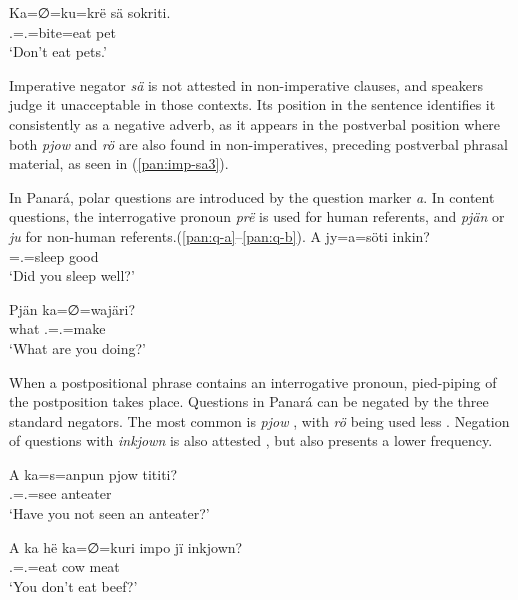 \documentclass[output=paper,colorlinks,citecolor=brown,draft]{langscibook}
\begin{document}
\ea\label{pan:imp-sa3}
    \gll Ka=∅=ku=krë sä sokriti.\\
    \Ssg.\Erg{}=\Tsg.\Abs{}=bite=eat \Neg{} pet \\
    \glt  `Don't eat pets.' \\
\z

Imperative negator \textit{sä} is not attested in non-imperative clauses, and speakers judge it unacceptable in those contexts. Its position in the sentence identifies it consistently as a negative adverb, as it appears in the postverbal position where both \textit{pjow} and \textit{rö} are also found in non-imperatives, preceding postverbal phrasal material, as seen in (\ref{pan:imp-sa3}).

In Panará, polar questions are introduced by the question marker \textit{a}. In content questions, the interrogative pronoun \textit{prë} is used for human referents, and \textit{pjän} or \textit{ju} for non-human referents.(\ref{pan:q-a}--\ref{pan:q-b}). 
\ea\label{pan:q-a}
    \gll A jy=a=söti inkin? \\
    \Q{} \Intr{}=\Ssg.\Abs{}=sleep good  \\
    \glt `Did you sleep well?' \\
\z

\ea\label{pan:q-b}
    \gll Pjän ka=∅=wajäri? \\
    what \Ssg.\Erg{}=\Tsg.\Abs{}=make\\
    \glt `What are you doing?' \\
\z 

When a postpositional phrase contains an interrogative pronoun, pied-piping of the postposition takes place. Questions in Panará can be negated by the three standard negators. The most common is \textit{pjow} , with \textit{rö} being used less . Negation of questions with \textit{inkjown} is also attested , but also presents a lower frequency.

\ea\label{pan:q-neg1}
    \gll A ka=s=anpun pjow tititi? \\
    \Q{} \Ssg.\Erg{}=\Tsg.\Abs{}=see \Neg{} anteater  \\
    \glt `Have you not seen an anteater?' \\
\z

\ea\label{pan:q-neg2}
    \gll A ka hë ka=∅=kuri impo jï inkjown? \\
    \Q{} \Ssg{} \Erg{} \Ssg.\Erg{}=\Tsg.\Abs{}=eat  cow meat \Neg{}  \\
    \glt `You don't eat beef?' \\
\z
\end{document}
